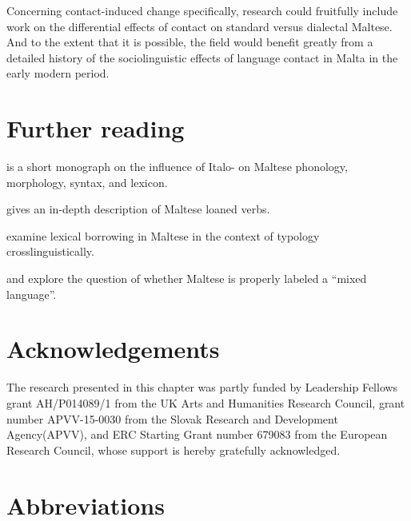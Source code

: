 \documentclass[output=paper]{langsci/langscibook}
\begin{document}
Concerning contact-induced change specifically,  research could fruitfully include  work on the differential effects of contact on standard versus dialectal Maltese. And to the extent that it is possible, the field would benefit greatly from a detailed history of the sociolinguistic effects of language contact in Malta in the early modern period.

\section*{Further reading}
\begin{furtherreading}
\item[\cite{krier1976}] is a short monograph on the influence of Italo- on Maltese phonology, morphology, syntax, and lexicon.
\item[\cite{mifsudloanverbs}] gives an in-depth description of Maltese loaned verbs.
\item[\cite{comriespagnol2016}] examine lexical borrowing in Maltese in the context of  typology crosslinguistically.
\item[\cite{Drewes1994} and \cite{stolz2003}] explore the question of whether Maltese is properly labeled a ``mixed language''.
\end{furtherreading}

\section*{Acknowledgements}
The research presented in this chapter was partly funded by Leadership Fellows grant AH/P014089/1 from the UK Arts and Humanities Research Council, grant number APVV-15-0030 from the Slovak Research and Development Agency\linebreak\relax(APVV), and ERC Starting Grant number 679083 from the European Research Council, whose support is hereby gratefully acknowledged.

\section*{Abbreviations}
\end{document}
